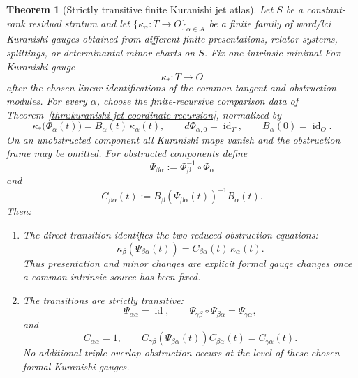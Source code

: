 \documentclass[11pt]{article}
\newtheorem{theorem}{Theorem}[section]
\theoremstyle{definition}
\begin{document}
\begin{theorem}[Strictly transitive finite Kuranishi jet atlas]\label{thm:kuranishi-common-source-atlas}
Let $S$ be a constant-rank residual stratum and let
$\{\kappa_\alpha:T\to O\}_{\alpha\in\mathcal A}$ be a finite family of
word/lci Kuranishi gauges obtained from different finite presentations,
relator systems, splittings, or determinantal minor charts on $S$.  Fix one
intrinsic minimal Fox Kuranishi gauge
\[
 \kappa_*:T\longrightarrow O
\]
after the chosen linear identifications of the common tangent and obstruction
modules.  For every $\alpha$, choose the finite-recursive comparison data of
Theorem~\ref{thm:kuranishi-jet-coordinate-recursion}, normalized by
\begin{equation}\label{eq:kuranishi-common-source-comparison}
 \kappa_*\bigl(\Phi_\alpha(t)\bigr)
 =B_\alpha(t)\,\kappa_\alpha(t),
 \qquad
 d\Phi_{\alpha,0}=\operatorname{id}_T,
 \qquad
 B_\alpha(0)=\operatorname{id}_O.
\end{equation}
On an unobstructed component all Kuranishi maps vanish and the obstruction
frame may be omitted.  For obstructed components define
\begin{equation}\label{eq:kuranishi-direct-source-transition}
 \Psi_{\beta\alpha}
 :=\Phi_\beta^{-1}\circ\Phi_\alpha
\end{equation}
and
\begin{equation}\label{eq:kuranishi-direct-obstruction-transition}
 C_{\beta\alpha}(t)
 :=B_\beta\!\left(\Psi_{\beta\alpha}(t)\right)^{-1}B_\alpha(t).
\end{equation}
Then:
\begin{enumerate}[label=\textnormal{(\roman*)}]
\item The direct transition identifies the two reduced obstruction equations:
\begin{equation}\label{eq:kuranishi-direct-gauge-equivalence}
 \kappa_\beta\!\left(\Psi_{\beta\alpha}(t)\right)
 =C_{\beta\alpha}(t)\,\kappa_\alpha(t).
\end{equation}
Thus presentation and minor changes are explicit formal gauge changes once a
common intrinsic source has been fixed.

\item The transitions are strictly transitive:
\begin{equation}\label{eq:kuranishi-strict-source-cocycle}
 \Psi_{\alpha\alpha}=\operatorname{id},
 \qquad
 \Psi_{\gamma\beta}\circ\Psi_{\beta\alpha}
 =\Psi_{\gamma\alpha},
\end{equation}
and
\begin{equation}\label{eq:kuranishi-strict-obstruction-cocycle}
 C_{\alpha\alpha}=1,
 \qquad
 C_{\gamma\beta}\!\left(\Psi_{\beta\alpha}(t)\right)
 C_{\beta\alpha}(t)
 =C_{\gamma\alpha}(t).
\end{equation}
No additional triple-overlap obstruction occurs at the level of these chosen
formal Kuranishi gauges.


\end{enumerate}
\end{theorem}
\end{document}
